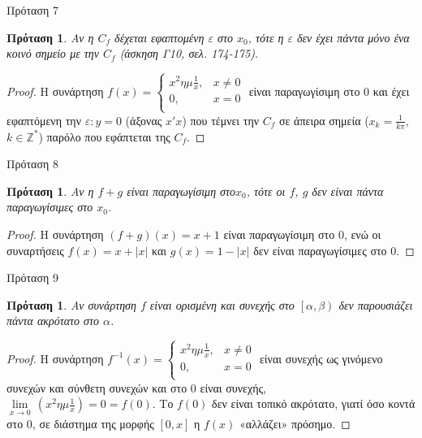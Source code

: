 \documentclass[greek]{beamer}
\newtheorem{proposition}[theorem]{Πρόταση}
\begin{document}
\begin{frame}{Πρόταση 7}
 \begin{proposition}
  \normalfont Αν η ${{C}_{f}}$ δέχεται εφαπτομένη $\varepsilon $ στο ${{x}_{0}}$, τότε η $\varepsilon $ δεν έχει πάντα μόνο ένα κοινό σημείο με την ${{C}_{f}}$ (άσκηση Γ10, σελ. 174-175).
 \end{proposition}
 \begin{proof}
  Η συνάρτηση $f\left( x \right)=\left\{ \begin{array}{*{35}{l}}
    {{x}^{2}}\eta \mu \frac{1}{x}, & x\ne 0 \\
    0,                             & x=0    \\
   \end{array} \right.$ είναι παραγωγίσιμη στο $0$ και έχει εφαπτόμενη την $\varepsilon :y=0$ (άξονας $x'x$) που τέμνει την ${{C}_{f}}$ σε άπειρα σημεία (${{x}_{k}}=\frac{1}{k\pi }$, $k\in {{\mathbb{Z}}^{*}}$) παρόλο που εφάπτεται της ${{C}_{f}}$.
 \end{proof}
\end{frame}

\begin{frame}{Πρόταση 8}
 \begin{proposition}
  \normalfont Αν η $f+g$ είναι παραγωγίσιμη στο${{x}_{0}}$, τότε οι $f$, $g$ δεν είναι πάντα παραγωγίσιμες στο ${{x}_{0}}$.
 \end{proposition}
 \begin{proof}
  H συνάρτηση $\left( f+g \right)\left( x \right)=x+1$ είναι παραγωγίσιμη στο $0$, ενώ οι συναρτήσεις $f\left( x \right)=x+\left| x \right|$ και $g\left( x \right)=1-\left| x \right|$ δεν είναι παραγωγίσιμες στο $0$.
 \end{proof}
\end{frame}

\begin{frame}{Πρόταση 9}
 \begin{proposition}
  \normalfont Aν συνάρτηση $f$ είναι ορισμένη και συνεχής στο $\left[ \alpha ,\beta  \right)$ δεν παρουσιάζει πάντα ακρότατο στο $\alpha $.
 \end{proposition}
 \begin{proof}
  H συνάρτηση ${{f}^{-1}}\left( x \right)=\left\{ \begin{array}{*{35}{l}}
    {{x}^{2}}\eta \mu \frac{1}{x}, & x\ne 0 \\      0, & x=0  \\
   \end{array} \right.$ είναι συνεχής ως γινόμενο συνεχών και σύνθετη συνεχών και στο $0$ είναι συνεχής, $\underset{x\to 0}{\mathop{\lim }}\,\left( {{x}^{2}}\eta \mu \frac{1}{x} \right)=0=f\left( 0 \right)$. Το $f\left( 0 \right)$ δεν είναι τοπικό ακρότατο, γιατί όσο κοντά στο $0$, σε διάστημα της μορφής
  $\left[ 0,x \right]$ η $f\left( x \right)$ «αλλάζει» πρόσημο.
 \end{proof}
\end{frame}
\end{document}
